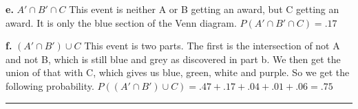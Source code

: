 \textbf{e.} $A' \cap B' \cap C$ \newline
This event is neither A or B getting an award, but C getting an award. It is only the blue section of the Venn diagram. $P(A' \cap B' \cap C) = .17$

\textbf{f.} $(A' \cap B') \cup C$ \newline 
This event is two parts. The first is the intersection of not A and not B, which is still blue and grey as discovered in part b. We then get the union of that with C, which gives us blue, green, white and purple. So we get the following probability. \newline 
$P((A' \cap B') \cup C) = .47 + .17 + .04 + .01 + .06 = .75$ \newline 
\hrule 